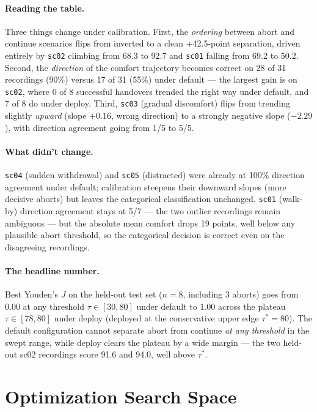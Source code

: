 \documentclass[11pt]{article}
\begin{document}
\paragraph{Reading the table.}
Three things change under calibration. First, the \textit{ordering} between
abort and continue scenarios flips from inverted to a clean +42.5-point
separation, driven entirely by \texttt{sc02} climbing from 68.3 to 92.7 and
\texttt{sc01} falling from 69.2 to 50.2. Second, the \textit{direction} of
the comfort trajectory becomes correct on 28 of 31 recordings (90\%) versus
17 of 31 (55\%) under default --- the largest gain is on \texttt{sc02},
where 0 of 8 successful handovers trended the right way under default, and
7 of 8 do under deploy. Third, \texttt{sc03} (gradual discomfort) flips from
trending slightly \emph{upward} (slope $+0.16$, wrong direction) to a
strongly negative slope ($-2.29$), with direction agreement going from 1/5
to 5/5.

\paragraph{What didn't change.}
\texttt{sc04} (sudden withdrawal) and \texttt{sc05} (distracted) were
already at 100\% direction agreement under default; calibration steepens
their downward slopes (more decisive aborts) but leaves the categorical
classification unchanged. \texttt{sc01} (walk-by) direction agreement stays
at 5/7 --- the two outlier recordings remain ambiguous --- but the absolute
mean comfort drops 19 points, well below any plausible abort threshold, so
the categorical decision is correct even on the disagreeing recordings.

\paragraph{The headline number.}
Best Youden's $J$ on the held-out test set ($n{=}8$, including 3 aborts)
goes from $0.00$ at any threshold $\tau \in [30, 80]$ under default to
$1.00$ across the plateau $\tau \in [78, 80]$ under deploy (deployed at the
conservative upper edge $\tau^{*} = 80$). The default configuration cannot
separate abort from continue \emph{at any threshold} in the swept range,
while deploy clears the plateau by a wide margin --- the two held-out sc02
recordings score 91.6 and 94.0, well above $\tau^{*}$.

\clearpage
\section*{Optimization Search Space}
\end{document}
